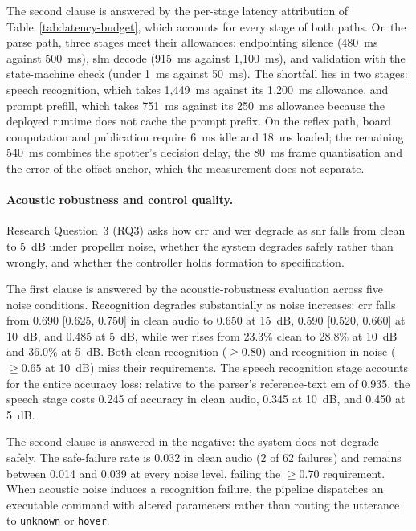 The second clause is answered by the per-stage latency attribution of Table~\ref{tab:latency-budget},
which accounts for every stage of both paths. On the parse path, three stages meet their
allowances: endpointing silence (480~ms against 500~ms), \gls{slm} decode (915~ms against 1{,}100~ms),
and validation with the state-machine check (under 1~ms against 50~ms). The shortfall lies in two
stages: speech recognition, which takes 1{,}449~ms against its 1{,}200~ms allowance, and prompt
prefill, which takes 751~ms against its 250~ms allowance because the deployed runtime does not cache the
prompt prefix. On the reflex path, board computation and publication require 6~ms idle and 18~ms loaded;
the remaining 540~ms combines the spotter's decision delay, the 80~ms frame quantisation and the error
of the offset anchor, which the measurement does not separate.

\paragraph{Acoustic robustness and control quality.} Research Question~3 (RQ3) asks how
\gls{crr} and \gls{wer} degrade as \gls{snr} falls from clean to 5~dB under propeller noise, whether the
system degrades safely rather than wrongly, and whether the controller holds formation to specification.

The first clause is answered by the acoustic-robustness evaluation across five noise conditions.
Recognition degrades substantially as noise increases: \gls{crr} falls from 0.690 [0.625, 0.750] in
clean audio to 0.650 at 15~dB, 0.590 [0.520, 0.660] at 10~dB, and 0.485 at 5~dB, while \gls{wer} rises
from 23.3\% clean to 28.8\% at 10~dB and 36.0\% at 5~dB. Both clean recognition ($\geq 0.80$) and
recognition in noise ($\geq 0.65$ at 10~dB) miss their requirements. The speech recognition stage
accounts for the entire accuracy loss: relative to the parser's reference-text \gls{em} of 0.935, the
speech stage costs 0.245 of accuracy in clean audio, 0.345 at 10~dB, and 0.450 at 5~dB.

The second clause is answered in the negative: the system does not degrade safely. The safe-failure rate
is 0.032 in clean audio (2 of 62 failures) and remains between 0.014 and 0.039 at every noise level,
failing the $\geq 0.70$ requirement. When acoustic noise induces a recognition failure, the pipeline
dispatches an executable command with altered parameters rather than routing the utterance to
\texttt{unknown} or \texttt{hover}.

